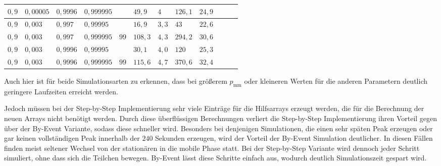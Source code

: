 \begin{table}[h]
\begin{tabular}{|l|l|l|l||l||l|l|l|l|l|l|l|}
$ 0,9  $ & $0,00005$ & $0,9996$ & $0,999995$ && $49,9   $ & $4 $     & $126,1 $ & $24,9 $  \\ \hline
$ 0,9  $ & $0,003 $  & $0,997$  & $0,99995$  && $16,9   $ & $3,3 $   & $43    $ & $22,6 $  \\ \hline
\cellcolor{gray!25}$ 0,9  $ & \cellcolor{gray!25}$0,003 $  & \cellcolor{gray!25}$0,997$  & \cellcolor{gray!25}$0,999995$ &$99$& $108,3$ & $4,3   $ & $294,2 $ & $30,6 $  \\ \hline
$ 0,9  $ & $0,003 $  & $0,9996$ & $0,99995$  && $30,1   $ & $4,0 $   & $120 $   & $25,3 $  \\ \hline
\cellcolor{gray!25}$ 0,9  $ & \cellcolor{gray!25}$0,003 $  & \cellcolor{gray!25}$0,9996$ & \cellcolor{gray!25}$0,999995$ &$99$& $115,6$ & $4,7   $ & $370,6 $ & $32,4$  \\ \hline
\end{tabular}
\end{table}
Auch hier ist für beide Simulationsarten zu erkennen, dass bei größerem $p_\text{mm}$ oder kleineren Werten für die anderen Parametern deutlich geringere Laufzeiten erreicht werden.

Jedoch müssen bei der Step-by-Step Implementierung sehr viele Einträge für die Hilfsarrays erzeugt werden, die für die Berechnung der neuen Arrays nicht benötigt werden. Durch diese überflüssigen Berechnungen verliert die Step-by-Step Implementierung ihren Vorteil gegen über der By-Event Variante, sodass diese schneller wird. Besonders bei denjenigen Simulationen, die einen sehr späten Peak erzeugen oder gar keinen vollständigen Peak innerhalb der $240$ Sekunden erzeugen, wird der Vorteil der By-Event Simulation deutlicher. In diesen Fällen finden meist seltener Wechsel von der stationären in die mobile Phase statt. Bei der Step-by-Step Variante wird dennoch jeder Schritt simuliert, ohne dass sich die Teilchen bewegen. By-Event lässt diese Schritte einfach aus, wodurch deutlich Simulationszeit gespart wird. 


